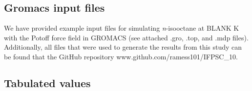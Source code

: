 \documentclass[preprint,review,12pt]{elsarticle}
\begin{document}
	\subsection{Gromacs input files}
	
	We have provided example input files for simulating \textit{n}-isooctane at BLANK K with the Potoff force field in GROMACS (see attached .gro, .top, and .mdp files). Additionally, all files that were used to generate the results from this study can be found that the GitHub repository www.github.com/ramess101/IFPSC\_10.
	
%	
	\subsection{Tabulated values}
	
\end{document}
